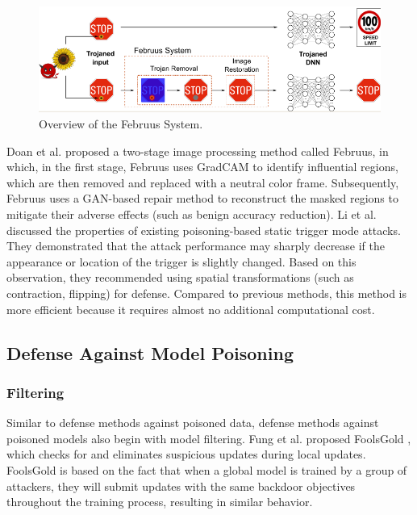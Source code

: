 \documentclass[conference]{IEEEtran}
\begin{document}
\begin{figure}[htbp]
    \centerline{\includegraphics[width=0.8\linewidth,height=0.4\linewidth]{picture/f9.png}}
    \caption{Overview of the Februus System.}
    \label{fig9}
\end{figure}
Doan et al. \cite{b76}proposed a two-stage image processing method called Februus, in which,
in the first stage, Februus uses GradCAM to identify influential regions, which are then
removed and replaced with a neutral color frame. Subsequently, Februus uses a GAN-based
repair method to reconstruct the masked regions to mitigate their adverse effects (such as benign accuracy reduction).
Li et al. \cite{b77} discussed the properties of existing poisoning-based static trigger mode attacks. They demonstrated
that the attack performance may sharply decrease if the appearance or location of the trigger is slightly changed.
Based on this observation, they recommended using spatial transformations (such as contraction, flipping)
for defense. Compared to previous methods, this method is more efficient because it requires almost no additional computational cost.

\subsection{Defense Against Model Poisoning}
\subsubsection{Filtering}
Similar to defense methods against poisoned data, defense methods against poisoned models also begin with model filtering.
Fung et al. proposed FoolsGold \cite{b78}, which checks for and eliminates suspicious updates during local updates.
FoolsGold is based on the fact that when a global model is trained by a group of attackers, they will submit updates with
the same backdoor objectives throughout the training process, resulting in similar behavior.
\end{document}

